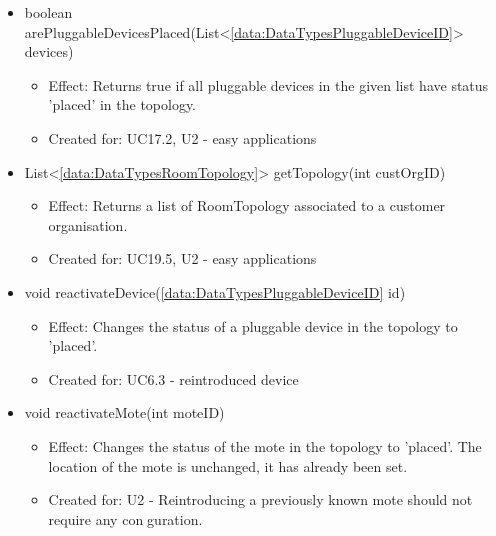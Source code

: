 \begin{description}
\begin{itemize}[noitemsep,nolistsep,leftmargin=-.25cm]
      \item \textsf{boolean arePluggableDevicesPlaced(List\textless{}\ref{data:DataTypesPluggableDeviceID}\textgreater{} devices)}
        \begin{itemize}[noitemsep,nolistsep]
           \item Effect: Returns true if all pluggable devices in the given list have status 'placed' in the topology.
\item Created for: UC17.2, U2 - easy applications
        \end{itemize}
      \item \textsf{List\textless{}\ref{data:DataTypesRoomTopology}\textgreater{} getTopology(int custOrgID)}
        \begin{itemize}[noitemsep,nolistsep]
           \item Effect: Returns a list of RoomTopology associated to a customer organisation.
\item Created for: UC19.5, U2 - easy applications
        \end{itemize}
      \item \textsf{void reactivateDevice(\ref{data:DataTypesPluggableDeviceID} id)}
        \begin{itemize}[noitemsep,nolistsep]
           \item Effect: Changes the status of a pluggable device in the topology to 'placed'.
\item Created for: UC6.3 - reintroduced device
        \end{itemize}
      \item \textsf{void reactivateMote(int moteID)}
        \begin{itemize}[noitemsep,nolistsep]
           \item Effect: Changes the status of the mote in the topology to 'placed'. The location of the mote is unchanged, it has already been set.
\item Created for: U2 - Reintroducing a previously known mote should not require any conguration.
        \end{itemize}
    \end{itemize}
    \end{description}


